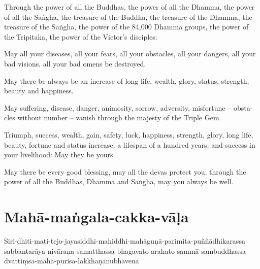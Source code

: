 \begin{english}
  Through the power of all the Buddhas, the power of all the Dhamma, the power of all the Saṅgha,
  the treasure of the Buddha, the treasure of the Dhamma, the treasure of the Saṅgha,
  the power of the 84,000 Dhamma groups, the power of the Tripitaka, the power
  of the Victor's disciples:

  May all your diseases, all your fears, all your obstacles,
  all your dangers, all your bad visions, all your bad omens be destroyed.

  May there be always be an increase of long life, wealth, glory, status,
  strength, beauty and happiness.

  May suffering, disease, danger, animosity, sorrow, adversity, misfortune --
  obstacles without number -- vanish through the majesty of the Triple Gem.

  Triumph, success, wealth, gain, safety, luck, happiness, strength, glory, long
  life, beauty, fortune and status increase, a lifespan of a hundred years, and
  success in your livelihood: May they be yours.

  May there be every good blessing, may all the devas protect you, through the
  power of all the Buddhas, Dhamma and Saṅgha, may you always be well.
\end{english}

\section{Mahā-maṅgala-cakka-vāḷa}


Siri-dhiti-mati-tejo-jayasiddhi-mahiddhi-mahāguṇā-parimita-puññādhikarassa
sabbantarāya-nivāraṇa-samatthassa bhagavato arahato sammā-sambuddhassa
dvattiṃsa-mahā-purisa-lakkhaṇānubhāvena

